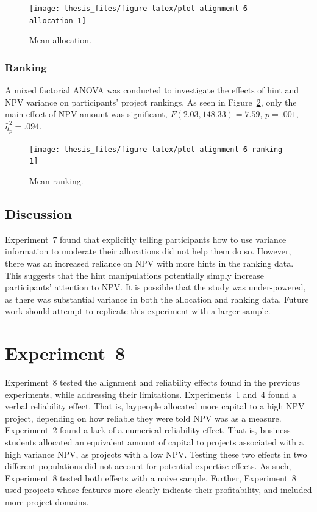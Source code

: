 \documentclass[a4paper, nobind, dvipsnames]{templates/ociamthesis}
\theoremstyle{definition}
\theoremstyle{definition}
\theoremstyle{definition}
\theoremstyle{definition}
\theoremstyle{remark}
\begin{document}
\begin{figure}
\texttt{[image: thesis\_files/figure-latex/plot-alignment-6-allocation-1]} \caption{Mean allocation.}\label{fig:plot-alignment-6-allocation}
\end{figure}

\subsubsection{Ranking}

A mixed factorial ANOVA was conducted to investigate the effects of hint and NPV
variance on participants' project rankings. As seen in
Figure~\ref{fig:plot-alignment-6-ranking}, only the main effect of NPV amount
was significant, \(F(2.03, 148.33) = 7.59\), \(p = .001\), \(\hat{\eta}^2_p = .094\).



\begin{figure}
\texttt{[image: thesis\_files/figure-latex/plot-alignment-6-ranking-1]} \caption{Mean ranking.}\label{fig:plot-alignment-6-ranking}
\end{figure}

\subsection{Discussion}

Experiment~7 found that explicitly telling participants how to use variance
information to moderate their allocations did not help them do so. However,
there was an increased reliance on NPV with more hints in the ranking data. This
suggests that the hint manipulations potentially simply increase participants'
attention to NPV. It is possible that the study was under-powered, as there was
substantial variance in both the allocation and ranking data. Future work should
attempt to replicate this experiment with a larger sample.

\hypertarget{alignment-7}{%
\section{Experiment~8}\label{alignment-7}}

Experiment~8 tested the alignment and reliability effects found in the previous
experiments, while addressing their limitations. Experiments~1 and~4 found a
verbal reliability effect. That is, laypeople allocated more capital to a high
NPV project, depending on how reliable they were told NPV was as a measure.
Experiment~2 found a lack of a numerical reliability effect. That is, business
students allocated an equivalent amount of capital to projects associated with a
high variance NPV, as projects with a low NPV. Testing these two effects in two
different populations did not account for potential expertise effects. As such,
Experiment~8 tested both effects with a naive sample. Further, Experiment~8 used
projects whose features more clearly indicate their profitability, and included
more project domains.
\end{document}
